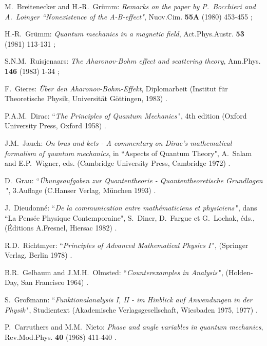 \documentclass[a4wide,12pt]{report}
\begin{document}
\begin{thebibliography}{22}
\newcommand{\artref}[5]{{\sc #1}: {\it #2}, #3 {\bf #4} #5}
\newcommand{\bookref}[3]{{\sc #1}: ``{\it #2}$\,$", #3}
\newcommand{\prepref}[3]{{\sc #1}: {\it #2}, #3}
 

\artref
{M.~Breitenecker and H.-R.~Gr\"umm}{Remarks on the paper
by P.~Bocchieri and A.~Loinger ``Nonexistence of the A-B-effect"}{
Nuov.Cim.}{55A}{(1980) 453-455 ;}
 
\artref
{H.-R.~Gr\"umm}{Quantum mechanics in a magnetic field}{
Act.Phys.Austr.}{53}{(1981) 113-131 ;}
 
\artref
{S.N.M.~Ruisjenaars}{The Aharonov-Bohm
effect and scattering theory}{Ann.Phys.}{
146}{(1983) 1-34 ;}
 
\prepref
{F.~Gieres}{\"Uber den Aharonov-Bohm-Effekt}{Diplomarbeit
(Institut f\"ur Theoretische Physik, 
Universit\"at G\"ottingen, 1983) .}


\bookref
{P.A.M.~Dirac}{The Principles of Quantum Mechanics}{4th edition
(Oxford University Press, Oxford 1958) .}

 
\prepref
{J.M.~Jauch}{On bras and kets 
- A commentary on Dirac's mathematical formalism 
of quantum mechanics}{in ``Aspects of Quantum Theory",
A.~Salam and E.P.~Wigner, eds. (Cambridge University Press,
Cambridge 1972) .}

 
\bookref
{D.~Grau}{\"Ubungsaufgaben zur Quantentheorie - Quantentheoretische
Grund\-lagen}{3.Auflage (C.Hanser Verlag, M\"unchen 1993) .}


\bookref
{J.~Dieudonn\'e}{De la communication entre math\'ematiciens et 
physiciens}{dans ``La Pens\'ee Physique Contemporaine", 
S.~Diner, D.~Fargue et G.~Lochak, \'eds., (\'Editions A.Fresnel, 
Hiersac 1982) .}
 
 
\bookref
{R.D.~Richtmyer}{Principles of Advanced Mathematical Physics I}{
(Springer Verlag, Berlin 1978) .}


\bookref
{B.R.~Gelbaum and J.M.H.~Olmsted}{Counterexamples in
Analysis}{(Holden-Day, San Francisco 1964) .}


\bookref
{S.~Gro\ss mann}{Funktionalanalysis I, II - im Hinblick auf
Anwendungen in der Physik}{Studientext (Akademische
Verlagsgesellschaft, Wiesbaden 1975, 1977) .}


\artref
{P.~Carruthers and M.M.~Nieto}{Phase and angle variables in quantum
mechanics}{Rev.Mod.Phys.}{40}{(1968) 411-440 .}
 

\end{thebibliography}
\end{document}
